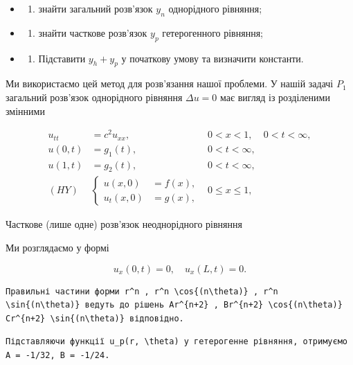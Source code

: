 \documentclass[
  ukrainian,
]{article}
\providecommand{\tightlist}{%
  \setlength{\itemsep}{0pt}\setlength{\parskip}{0pt}}
\begin{document}
\begin{itemize}
\tightlist
\item
  \begin{enumerate}
  \def\labelenumi{\arabic{enumi})}
  \tightlist
  \item
    знайти загальний розв'язок \(y_n\) однорідного рівняння;
  \end{enumerate}
\item
  \begin{enumerate}
  \def\labelenumi{\arabic{enumi})}
  \setcounter{enumi}{1}
  \tightlist
  \item
    знайти часткове розв'язок \(y_p\) гетерогенного рівняння;
  \end{enumerate}
\item
  \begin{enumerate}
  \def\labelenumi{\arabic{enumi})}
  \setcounter{enumi}{2}
  \tightlist
  \item
    Підставити \(y_h + y_p\) у початкову умову та визначити константи.
  \end{enumerate}
\end{itemize}

Ми використаємо цей метод для розв'язання нашої проблеми. У нашій задачі
\(P_1\) загальний розв'язок однорідного рівняння \(\Delta u=0\) має
вигляд із розділеними змінними

\[
\begin{aligned} u_{tt} &= c^2 u_{xx}, & 0 < x < 1, & 0 < t < \infty, \\ u(0, t) &= g_1(t), & 0 < t < \infty, \\ u(1, t) &= g_2(t), & 0 < t < \infty, \\ (HY) &\begin{cases} u(x, 0) &= f(x), \\ u_t(x, 0) &= g(x), \end{cases} & 0 \leqslant x \leqslant 1, \end{aligned}
\]

Часткове (лише одне) розв'язок неоднорідного рівняння

Ми розглядаємо у формі

\[
u_x(0, t) = 0, \quad u_x(L, t) = 0.
\]

\begin{verbatim}
Правильні частини форми r^n , r^n \cos{(n\theta)} , r^n \sin{(n\theta)} ведуть до рішень Ar^{n+2} , Br^{n+2} \cos{(n\theta)} Cr^{n+2} \sin{(n\theta)} відповідно.
\end{verbatim}

\begin{verbatim}
Підставляючи функції u_p(r, \theta) у гетерогенне рівняння, отримуємо A = -1/32, B = -1/24.
\end{verbatim}
\end{document}

